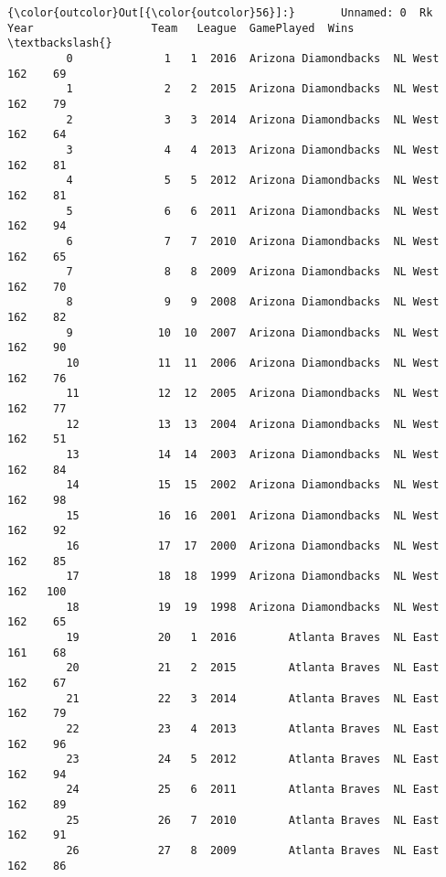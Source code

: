 \documentclass[11pt]{article}
\begin{document}
\begin{Verbatim}[commandchars=\\\{\}]
{\color{outcolor}Out[{\color{outcolor}56}]:}       Unnamed: 0  Rk  Year                  Team   League  GamePlayed  Wins  \textbackslash{}
         0              1   1  2016  Arizona Diamondbacks  NL West         162    69   
         1              2   2  2015  Arizona Diamondbacks  NL West         162    79   
         2              3   3  2014  Arizona Diamondbacks  NL West         162    64   
         3              4   4  2013  Arizona Diamondbacks  NL West         162    81   
         4              5   5  2012  Arizona Diamondbacks  NL West         162    81   
         5              6   6  2011  Arizona Diamondbacks  NL West         162    94   
         6              7   7  2010  Arizona Diamondbacks  NL West         162    65   
         7              8   8  2009  Arizona Diamondbacks  NL West         162    70   
         8              9   9  2008  Arizona Diamondbacks  NL West         162    82   
         9             10  10  2007  Arizona Diamondbacks  NL West         162    90   
         10            11  11  2006  Arizona Diamondbacks  NL West         162    76   
         11            12  12  2005  Arizona Diamondbacks  NL West         162    77   
         12            13  13  2004  Arizona Diamondbacks  NL West         162    51   
         13            14  14  2003  Arizona Diamondbacks  NL West         162    84   
         14            15  15  2002  Arizona Diamondbacks  NL West         162    98   
         15            16  16  2001  Arizona Diamondbacks  NL West         162    92   
         16            17  17  2000  Arizona Diamondbacks  NL West         162    85   
         17            18  18  1999  Arizona Diamondbacks  NL West         162   100   
         18            19  19  1998  Arizona Diamondbacks  NL West         162    65   
         19            20   1  2016        Atlanta Braves  NL East         161    68   
         20            21   2  2015        Atlanta Braves  NL East         162    67   
         21            22   3  2014        Atlanta Braves  NL East         162    79   
         22            23   4  2013        Atlanta Braves  NL East         162    96   
         23            24   5  2012        Atlanta Braves  NL East         162    94   
         24            25   6  2011        Atlanta Braves  NL East         162    89   
         25            26   7  2010        Atlanta Braves  NL East         162    91   
         26            27   8  2009        Atlanta Braves  NL East         162    86   

\end{Verbatim}
\end{document}
